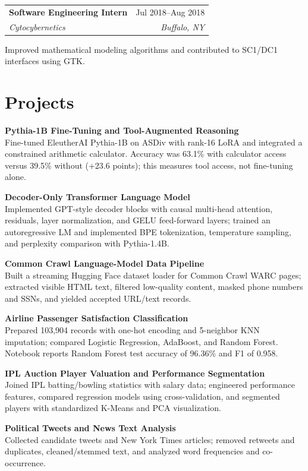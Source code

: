 \documentclass[11pt,a4paper]{article}
\makeatletter
\newcommand{\resumeentry}[4]{%
  \begin{tabularx}{\textwidth}{@{}Xr@{}}
    \textbf{#1} & \textcolor{muted}{#4} \\
    \textit{#2} & \textit{\textcolor{muted}{#3}}
  \end{tabularx}\par\vspace{-3pt}
}
\makeatother
\begin{document}
\vspace{3pt}
\resumeentry{Software Engineering Intern}{Cytocybernetics}{Buffalo, NY}{Jul 2018--Aug 2018}
Improved mathematical modeling algorithms and contributed to SC1/DC1 interfaces using GTK.

\section{Projects}
\small

\textbf{Pythia-1B Fine-Tuning and Tool-Augmented Reasoning}\\[-2pt]
Fine-tuned EleutherAI Pythia-1B on ASDiv with rank-16 LoRA and integrated a constrained arithmetic calculator. Accuracy was 63.1\% with calculator access versus 39.5\% without (+23.6 points); this measures tool access, not fine-tuning alone.

\vspace{3pt}
\textbf{Decoder-Only Transformer Language Model}\\[-2pt]
Implemented GPT-style decoder blocks with causal multi-head attention, residuals, layer normalization, and GELU feed-forward layers; trained an autoregressive LM and implemented BPE tokenization, temperature sampling, and perplexity comparison with Pythia-1.4B.

\vspace{3pt}
\textbf{Common Crawl Language-Model Data Pipeline}\\[-2pt]
Built a streaming Hugging Face dataset loader for Common Crawl WARC pages; extracted visible HTML text, filtered low-quality content, masked phone numbers and SSNs, and yielded accepted URL/text records.

\vspace{3pt}
\textbf{Airline Passenger Satisfaction Classification}\\[-2pt]
Prepared 103,904 records with one-hot encoding and 5-neighbor KNN imputation; compared Logistic Regression, AdaBoost, and Random Forest. Notebook reports Random Forest test accuracy of 96.36\% and F1 of 0.958.

\vspace{3pt}
\textbf{IPL Auction Player Valuation and Performance Segmentation}\\[-2pt]
Joined IPL batting/bowling statistics with salary data; engineered performance features, compared regression models using cross-validation, and segmented players with standardized K-Means and PCA visualization.

\vspace{3pt}
\textbf{Political Tweets and News Text Analysis}\\[-2pt]
Collected candidate tweets and New York Times articles; removed retweets and duplicates, cleaned/stemmed text, and analyzed word frequencies and co-occurrence.
\end{document}
